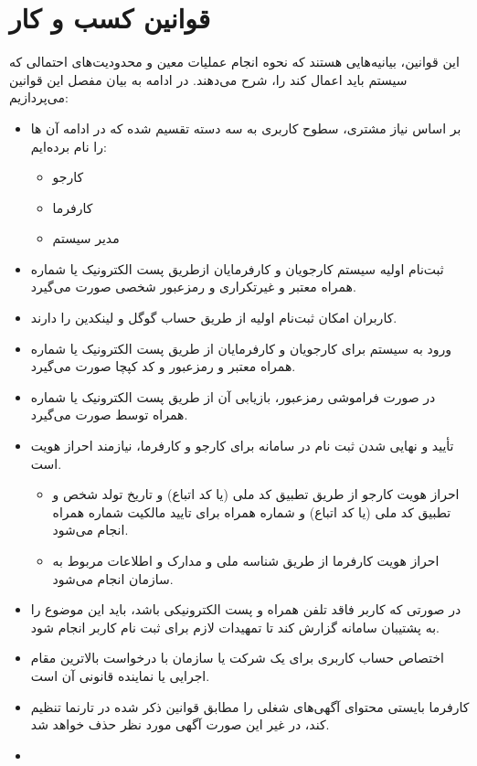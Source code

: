 \documentclass[12pt]{article}
\begin{document}
	\newpage
	\section{قوانین کسب و کار}
	این قوانین، بیانیه‌هایی هستند که نحوه انجام عملیات معین و محدودیت‌های احتمالی که سیستم باید اعمال کند را، شرح می‌دهند. در ادامه به بیان مفصل این قوانین می‌پردازیم:
	\begin{itemize}
		\item
		بر اساس نیاز مشتری، سطوح کاربری به سه دسته تقسیم شده که در ادامه آن ها را نام برده‌ایم:
		\begin{itemize}
			\item
			کارجو
			\item
			کارفرما
			\item
			مدیر سیستم
		\end{itemize}
		\item
		ثبت‌نام اولیه سیستم کارجویان و کارفرمایان از‌طریق پست الکترونیک یا شماره همراه معتبر و غیر‌تکراری و رمز‌عبور شخصی صورت می‌گیرد.
		\item
		کاربران امکان ثبت‌نام اولیه از طریق حساب گوگل و لینکدین را دارند.
		\item
		ورود به سیستم برای کارجویان و کارفرمایان از طر‌یق پست الکترونیک یا شماره همراه معتبر و رمز‌عبور و کد کپچا صورت می‌گیرد.
		\item
		در‌ صورت فراموشی رمز‌عبور، بازیابی آن از طریق پست الکترونیک یا شماره همراه توسط صورت می‌گیرد.
		\item
		تأیید و نهایی شدن ثبت نام در سامانه برای کارجو و کارفرما، نیازمند احراز هویت است.
		\begin{itemize}
			\item
			احراز هویت کارجو از طریق تطبیق کد ملی (یا کد اتباع) و تاریخ تولد شخص و تطبیق کد ملی (یا کد اتباع) و شماره همراه برای تایید مالکیت شماره همراه انجام می‌شود.
			\item
			احراز هویت کارفرما از طریق شناسه ملی و مدارک و اطلاعات مربوط به سازمان انجام می‌شود.
		\end{itemize}
		\item
		در ‌صورتی که کاربر فاقد تلفن همراه و پست الکترونیکی باشد، باید این موضوع را به پشتیبان سامانه گزارش کند تا تمهیدات لازم برای ثبت نام کاربر انجام شود.
		\item
		اختصاص حساب کاربری برای یک شرکت یا سازمان با درخواست بالاترین مقام اجرایی یا نماینده قانونی آن است.
		\item
		کارفرما بایستی محتوای آگهی‌های شغلی را مطابق قوانین ذکر شده در تارنما تنظیم کند، در غیر‌ این صورت آگهی مورد نظر حذف خواهد شد.
		\item

\end{itemize}
\end{document}
